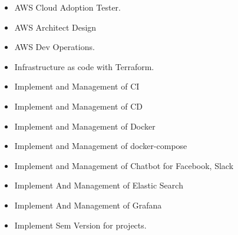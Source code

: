\documentclass[10pt,a4paper]{altacv}
\begin{document}

\begin{fullwidth}
\makecvheader
\end{fullwidth}


\begin{itemize}
  \item AWS Cloud Adoption Tester.
  \item AWS Architect Design
  \item AWS Dev Operations.
  \item Infrastructure as code with Terraform.
  \item Implement and Management of CI
  \item Implement and Management of CD
  \item Implement and Management of Docker
  \item Implement and Management of docker-compose
  \item Implement and Management of Chatbot for Facebook, Slack
  \item Implement And Management of Elastic Search
  \item Implement And Management of Grafana
  \item Implement Sem Version for projects.
\end{itemize}

\divider
\end{document}
